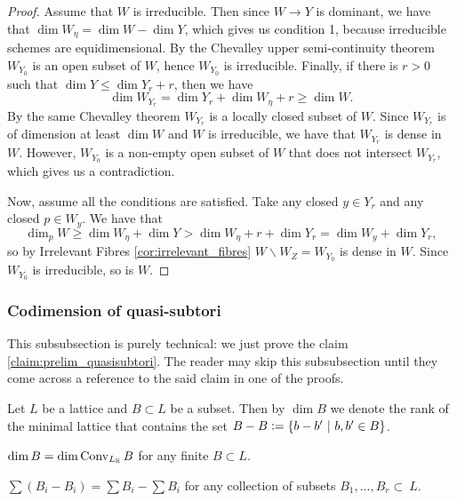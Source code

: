 \begin{proof}
    Assume that $W$ is irreducible. Then since $W \to Y$ is dominant, we have that $\dim W_\eta = \dim W - \dim Y$, which gives us condition 1, because irreducible schemes are equidimensional. By the Chevalley upper semi-continuity theorem $W_{Y_0}$ is an open subset of $W$, hence $W_{Y_0}$ is irreducible. Finally, if there is $r > 0$ such that $\dim Y \le \dim Y_r + r$, then we have 
    \[
    \dim W_{Y_r} = \dim Y_r + \dim W_\eta + r \ge \dim W.
    \]
    By the same Chevalley theorem $W_{Y_r}$ is a locally closed subset of $W$. Since $W_{Y_r}$ is of dimension at least $\dim W$ and $W$ is irreducible, we have that $W_{Y_r}$ is dense in $W$. However, $W_{Y_0}$ is a non-empty open subset of $W$ that does not intersect $W_{Y_r}$, which gives us a contradiction.

    Now, assume all the conditions are satisfied. Take any closed $y \in Y_r$ and any closed $p \in W_y$. We have that
    \[
    \dim_p W \ge \dim W_\eta + \dim Y > \dim W_\eta + r + \dim Y_r = \dim W_y + \dim Y_r,
    \]
    so by Irrelevant Fibres \autoref{cor:irrelevant_fibres} $W\backslash W_Z = W_{Y_0}$ is dense in $W$. Since $W_{Y_0}$ is irreducible, so is $W$.
\end{proof}

\subsubsection{Codimension of quasi-subtori}\label{sssec:techincal_codim}
This subsubsection is purely technical: we just prove the claim \ref{claim:prelim_quasisubtori}. The reader may skip this subsubsection until they come across a reference to the said claim in one of the proofs.

\begin{definition}
    Let $L$ be a lattice and $B \subset L$ be a subset. Then by $\dim B$ we denote the rank of the minimal lattice that contains the set $B - B \vcentcolon= \{ b - b'\ |\ b, b' \in B \}$.
\end{definition}

\begin{remark}
    $\dim B = \dim \operatorname{Conv}_{L_{\mathbb R}} B$ for any finite $B \subset L$.
\end{remark}

\begin{remark}
     $\sum (B_i - B_i) = \sum B_i - \sum B_i$ for any collection of subsets $B_1, \dots, B_r \subset ~L$.
\end{remark}

